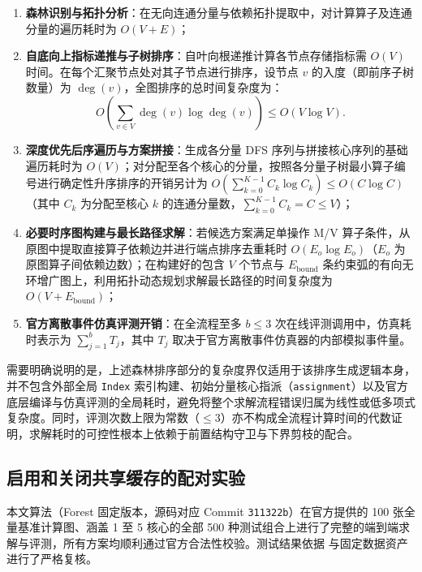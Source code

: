 \documentclass[anonymous,notoc]{gmcm2026}
\providecommand{\tightlist}{\setlength{\itemsep}{0pt}\setlength{\parskip}{0pt}}
\begin{document}
\begin{enumerate}
\def\labelenumi{\arabic{enumi}.}
\tightlist
\item
  \textbf{森林识别与拓扑分析}：在无向连通分量与依赖拓扑提取中，对计算算子及连通分量的遍历耗时为 \(O(V + E)\)；
\item
  \textbf{自底向上指标递推与子树排序}：自叶向根递推计算各节点存储指标需 \(O(V)\) 时间。在每个汇聚节点处对其子节点进行排序，设节点 \(v\) 的入度（即前序子树数量）为 \(\deg(v)\)，全图排序的总时间复杂度为： \begin{equation}
O\left( \sum_{v \in V} \deg(v) \log \deg(v) \right) \le O(V \log V).
\end{equation}
\item
  \textbf{深度优先后序遍历与方案拼接}：生成各分量 DFS 序列与拼接核心序列的基础遍历耗时为 \(O(V)\)；对分配至各个核心的分量，按照各分量子树最小算子编号进行确定性升序排序的开销另计为 \(O\left(\sum_{k=0}^{K-1} C_k \log C_k\right) \le O(C \log C)\)（其中 \(C_k\) 为分配至核心 \(k\) 的连通分量数，\(\sum_{k=0}^{K-1} C_k = C \le V\)）；
\item
  \textbf{必要时序图构建与最长路径求解}：若候选方案满足单操作 M/V 算子条件，从原图中提取直接算子依赖边并进行端点排序去重耗时 \(O(E_o \log E_o)\)（\(E_o\) 为原图算子间依赖边数）；在构建好的包含 \(V\) 个节点与 \(E_{\mathrm{bound}}\) 条约束弧的有向无环增广图上，利用拓扑动态规划求解最长路径的时间复杂度为 \(O(V + E_{\mathrm{bound}})\)；
\item
  \textbf{官方离散事件仿真评测开销}：在全流程至多 \(b \le 3\) 次在线评测调用中，仿真耗时表示为 \(\sum_{j=1}^b T_j\)，其中 \(T_j\) 取决于官方离散事件仿真器的内部模拟事件量。
\end{enumerate}

需要明确说明的是，上述森林排序部分的复杂度界仅适用于该排序生成逻辑本身，并不包含外部全局 \texttt{Index} 索引构建、初始分量核心指派（\texttt{assignment}）以及官方底层编译与仿真评测的全局耗时，避免将整个求解流程错误归属为线性或低多项式复杂度。同时，评测次数上限为常数（\(\le 3\)）亦不构成全流程计算时间的代数证明，求解耗时的可控性根本上依赖于前置结构守卫与下界剪枝的配合。

\subsection{启用和关闭共享缓存的配对实验}

本文算法（Forest 固定版本，源码对应 Commit \texttt{311322b}）在官方提供的 100 张全量基准计算图、涵盖 1 至 5 核心的全部 500 种测试组合上进行了完整的端到端求解与评测，所有方案均顺利通过官方合法性校验。测试结果依据 \texttt{} 与固定数据资产进行了严格复核。
\end{document}
